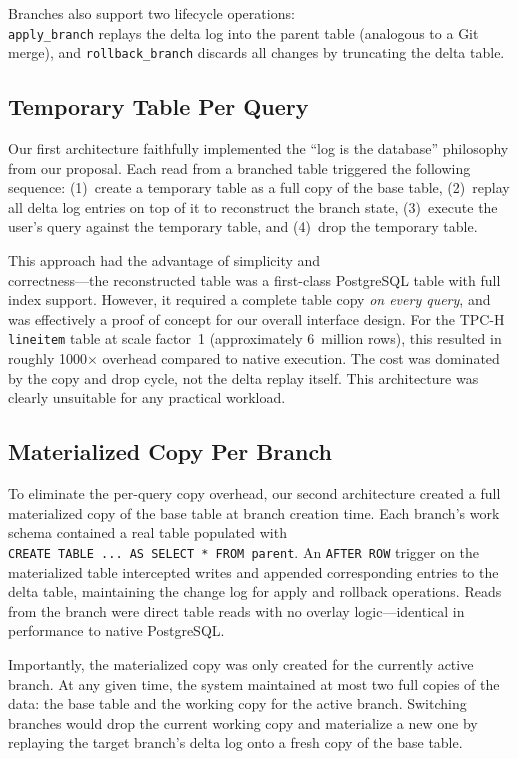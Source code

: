 \documentclass[sigplan, nonacm]{acmart}
\begin{document}
Branches also support two lifecycle operations: \\ \texttt{apply\_branch} replays the delta log into the parent table (analogous to a Git merge), and \texttt{rollback\_branch} discards all changes by truncating the delta table.

\subsection{Temporary Table Per Query}

Our first architecture faithfully implemented the ``log is the database'' philosophy from our proposal. Each read from a branched table triggered the following sequence: (1)~create a temporary table as a full copy of the base table, (2)~replay all delta log entries on top of it to reconstruct the branch state, (3)~execute the user's query against the temporary table, and (4)~drop the temporary table.

This approach had the advantage of simplicity and \\ correctness---the
reconstructed table was a first-class PostgreSQL table with full index support.
However, it required a complete table copy \emph{on every query}, and was
effectively a proof of concept for our overall interface design. For the TPC-H \texttt{lineitem} table at scale factor~1 (approximately 6~million rows), this resulted in roughly 1000$\times$ overhead compared to native execution. The cost was dominated by the copy and drop cycle, not the delta replay itself. This architecture was clearly unsuitable for any practical workload.

\subsection{Materialized Copy Per Branch}

To eliminate the per-query copy overhead, our second architecture created a full materialized copy of the base table at branch creation time. Each branch's work schema contained a real table populated with \\\texttt{CREATE~TABLE~...~AS~SELECT~*~FROM~parent}. An \texttt{AFTER~ROW} trigger on the materialized table intercepted writes and appended corresponding entries to the delta table, maintaining the change log for apply and rollback operations. Reads from the branch were direct table reads with no overlay logic---identical in performance to native PostgreSQL.

Importantly, the materialized copy was only created for the currently active branch. At any given time, the system maintained at most two full copies of the data: the base table and the working copy for the active branch. Switching branches would drop the current working copy and materialize a new one by replaying the target branch's delta log onto a fresh copy of the base table.
\end{document}
